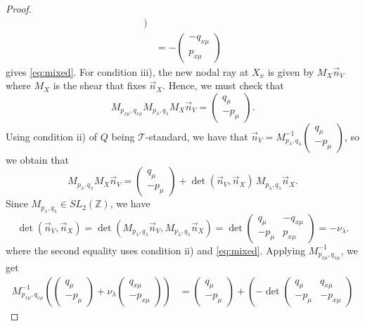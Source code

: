 \documentclass[11pt, reqno]{amsart}
\theoremstyle{remark}
\numberwithin{equation}{subsection}
\numberwithin{figure}{section}
\theoremstyle{customremark}
\newcommand{\la}{{\lambda}}
\begin{document}
\begin{proof}
\begin{align*}
    \bigr) \\
   &=-\begin{pmatrix} -q_{x\mu} \\ p_{x\mu} \end{pmatrix}
\end{align*}
gives \eqref{eq:mixed}. 
For condition iii), the new nodal ray at $X_x$ is given by $M_X\vec{n}_V$ 
where $M_X$ is the shear that fixes $\vec{n}_X$. Hence, we must check that
\[ M_{p_{x\mu},q_{x\mu}}M_{p_\lambda,q_\lambda}M_X\vec{n}_V = 
   \begin{pmatrix} q_\mu \\ -p_\mu \end{pmatrix}.\]
Using condition ii) of $Q$ being $\mathcal{T}$-standard, we have that 
$\vec{n}_V = M_{p_\lambda,q_\lambda}^{-1}\begin{pmatrix} q_\mu \\ -p_\mu 
\end{pmatrix}$, so we obtain that
\[ M_{p_\lambda,q_\lambda}M_X\vec{n}_V = 
   \begin{pmatrix} q_\mu \\ -p_\mu \end{pmatrix} 
   + \det(\vec{n}_V, \vec{n}_X)\, M_{p_\lambda,q_\lambda}\vec{n}_X.\]
Since \(M_{p_\lambda,q_\lambda}\in SL_2(\mathbb Z)\), we have
\[
\det(\vec n_V,\vec n_X)
=
\det\left(
M_{p_\lambda,q_\lambda}\vec n_V,
M_{p_\lambda,q_\lambda}\vec n_X
\right)=\det \begin{pmatrix}
    q_\mu & -q_{x\mu}\\ -p_\mu & p_{x\mu}
\end{pmatrix}=-\nu_\la.
\]
where the second equality uses condition ii) and \eqref{eq:mixed}. 
Applying 
$M_{p_{x\mu},q_{x\mu}}^{-1}$, we get
\begin{align*} 
    M_{p_{x\mu},q_{x\mu}}^{-1}\left(\begin{pmatrix} q_\mu \\ -p_\mu \end{pmatrix} 
    + \nu_\lambda\begin{pmatrix} q_{x\mu} \\ -p_{x\mu} \end{pmatrix}\right) 
    &= \begin{pmatrix} q_\mu \\ -p_\mu \end{pmatrix} 
    + \left(-\det\begin{pmatrix} q_\mu & q_{x\mu} \\ 
    -p_\mu & -p_{x\mu}\end{pmatrix} 

\end{align*}
\end{proof}
\end{document}
